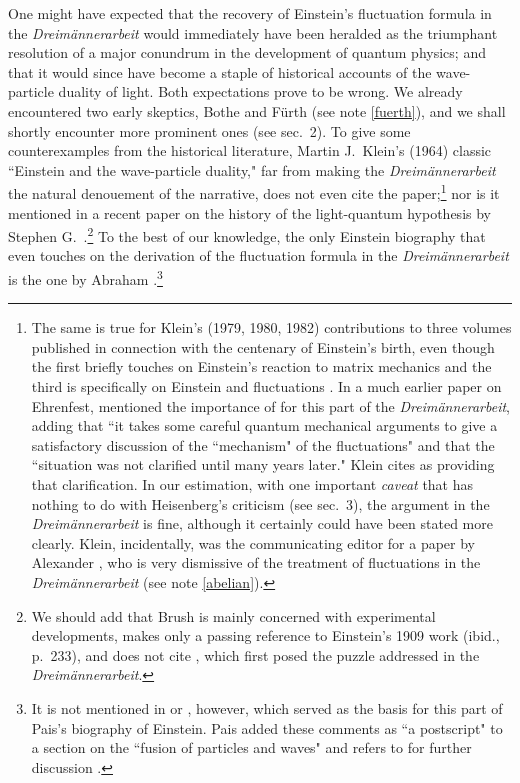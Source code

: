 \documentclass[12pt]{elsart}
\begin{document}
One might have expected that the recovery of Einstein's fluctuation formula in the {\it Dreim\"annerarbeit} would immediately have been heralded as the triumphant resolution of a major conundrum in the development of quantum physics; and that it would since have become a staple of historical accounts of the wave-particle duality of light. Both expectations prove to be wrong. We already encountered two early skeptics, Bothe and F\"urth (see note \ref{fuerth}), and we shall shortly encounter more prominent ones (see sec.\ 2). To give some counterexamples from the historical literature, Martin J.\ Klein's (1964) classic ``Einstein and the wave-particle duality," far from making the {\it Dreim\"annerarbeit} the natural denouement of the narrative, does not even cite the paper;\footnote{The same is true for Klein's (1979, 1980, 1982) contributions to three volumes published in connection with the centenary of Einstein's birth, even though the first briefly touches on Einstein's reaction to matrix mechanics \citep[p.\ 149]{Klein 1979} and the third is specifically on Einstein and fluctuations \citep{Klein 1982}. In a much earlier paper on Ehrenfest, \citet[p.\ 50]{Klein 1959} mentioned the importance of \citep{Ehrenfest 1925a} for this part of the {\it Dreim\"annerarbeit}, adding that ``it takes some careful quantum mechanical arguments to give a satisfactory discussion of the ``mechanism" of the fluctuations" and that the ``situation was not clarified until many years later." Klein cites \citep{Heisenberg 1931} as providing that clarification. In our estimation, with one important {\it caveat} that has nothing to do with Heisenberg's criticism (see sec.\ 3), the argument in the {\it Dreim\"annerarbeit} is fine, although it certainly could have been stated more clearly. Klein, incidentally, was the communicating editor for  a paper by Alexander \citet{Bach 1989}, who is very dismissive of the treatment of fluctuations in the {\it Dreim\"annerarbeit} (see note \ref{abelian}).} nor is it mentioned in a recent paper on the history of the light-quantum hypothesis by Stephen G.\ \citet{Brush 2007}.\footnote{We should add that Brush is mainly concerned with experimental developments, makes only a passing reference to Einstein's 1909 work (ibid., p.\ 233), and does not cite \citep{Einstein 1909a, Einstein 1909b},  which first posed the puzzle addressed in the {\it Dreim\"annerarbeit}.} To the best of our knowledge, the only Einstein biography that even touches on the derivation of the fluctuation formula in the {\it Dreim\"annerarbeit} is the one by Abraham \citet[p.\ 405]{Pais 1982}.\footnote{It is not mentioned in \citep{Pais 1979} or \citep{Pais 1980}, however, which served as the basis for this part of Pais's biography of Einstein. Pais added these comments as ``a postscript" to a section on the ``fusion of particles and waves" and refers to \citep{Gonzalez and Wergeland 1973} for further discussion \citep[pp.\ 402--405]{Pais 1982}.} 
\end{document}
